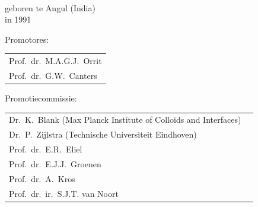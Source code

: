 \begin{titlepage}
\begin{center}
\makeatletter
{\Large\titlefont\bfseries\@firstname\ {\titleshape\@lastname}}
\makeatother

\bigskip
\bigskip


geboren te Angul (India) \\
in 1991

\vspace*{2\bigskipamount}

\end{center}

\clearpage
\thispagestyle{empty}

\noindent Promotores:

\medskip\noindent
\begin{tabular}{l}
    Prof.\ dr.\ M.A.G.J.\ Orrit \\
    Prof.\ dr.\ G.W.\ Canters
\end{tabular}


\medskip
\noindent Promotiecommissie:

\medskip\noindent
\begin{tabular}{ll}
    Dr.\ K.\ Blank (Max Planck Institute of Colloids and Interfaces) \\
    Dr.\ P.\ Zijlstra (Technische Universiteit Eindhoven) \\
    Prof.\ dr.\ E.R.\ Eliel \\
    Prof.\ dr.\ E.J.J.\ Groenen \\
    Prof.\ dr.\ A.\ Kros \\
    Prof.\ dr.\ ir.\ S.J.T. van Noort \\
\end{tabular}



\end{titlepage}
